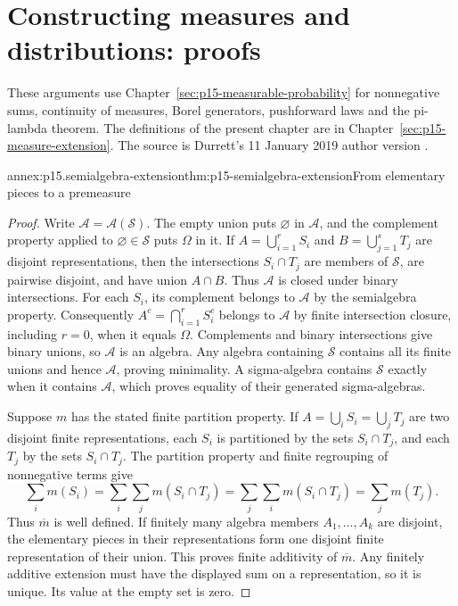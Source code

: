 \section{Constructing measures and distributions: proofs}
\label{sec:annex-p15-measure-extension}

These arguments use Chapter~\ref{sec:p15-measurable-probability} for
nonnegative sums, continuity of measures, Borel generators, pushforward
laws and the pi-lambda theorem. The definitions of the present chapter
are in Chapter~\ref{sec:p15-measure-extension}. The source is Durrett's
11 January 2019 author version
\cite[thms.~1.1.4, 1.1.9 and 1.2.2; app.~A.1]{DurrettPTEAuthor2019}.

\begin{annexitem}{annex:p15.semialgebra-extension}{thm:p15-semialgebra-extension}{From elementary pieces to a premeasure}
\begin{proof}
Write \(\mathcal A=\mathcal A(\mathcal S)\). The empty union puts
\(\varnothing\) in \(\mathcal A\), and the complement property
applied to \(\varnothing\in\mathcal S\) puts \(\Omega\) in it.
If \(A=\bigcup_{i=1}^r S_i\) and \(B=\bigcup_{j=1}^s T_j\)
are disjoint representations, then the intersections \(S_i\cap T_j\)
are members of \(\mathcal S\), are pairwise disjoint, and have union
\(A\cap B\). Thus \(\mathcal A\) is closed under binary
intersections. For each \(S_i\), its complement belongs to
\(\mathcal A\) by the semialgebra property. Consequently
\(A^c=\bigcap_{i=1}^r S_i^c\) belongs to \(\mathcal A\) by
finite intersection closure, including \(r=0\), when it equals
\(\Omega\). Complements and binary intersections give binary unions,
so \(\mathcal A\) is an algebra. Any algebra containing \(\mathcal S\)
contains all its finite unions and hence \(\mathcal A\), proving
minimality. A sigma-algebra contains \(\mathcal S\) exactly when it
contains \(\mathcal A\), which proves equality of their generated
sigma-algebras.

Suppose \(m\) has the stated finite partition property. If
\(A=\bigcup_i S_i=\bigcup_j T_j\) are two disjoint finite
representations, each \(S_i\) is partitioned by the sets
\(S_i\cap T_j\), and each \(T_j\) by the sets \(S_i\cap T_j\).
The partition property and finite regrouping of nonnegative terms give
\[
 \sum_i m(S_i)=\sum_i\sum_j m(S_i\cap T_j)
             =\sum_j\sum_i m(S_i\cap T_j)=\sum_j m(T_j).
\]
Thus \(\overline m\) is well defined. If finitely many algebra
members \(A_1,\ldots,A_k\) are disjoint, the elementary pieces in
their representations form one disjoint finite representation of their
union. This proves finite additivity of \(\overline m\). Any finitely
additive extension must have the displayed sum on a representation, so
it is unique. Its value at the empty set is zero.


\end{proof}
\end{annexitem}
